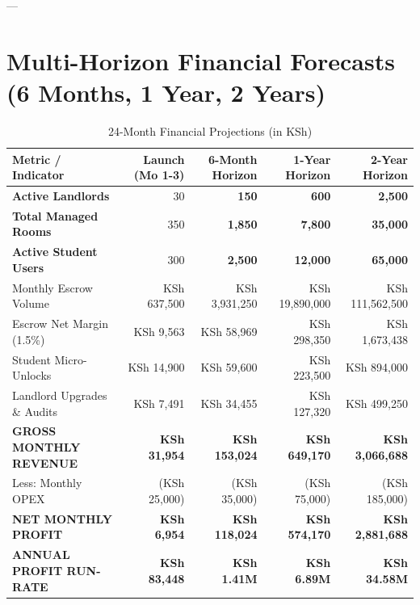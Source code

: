 \documentclass[11pt,a4paper]{article}
\begin{document}
---

\section{Multi-Horizon Financial Forecasts (6 Months, 1 Year, 2 Years)}

\begin{table}[h]
\centering
\begin{tabularx}{\textwidth}{X r r r r}
\toprule
\textbf{Metric / Indicator} & \textbf{Launch (Mo 1-3)} & \textbf{6-Month Horizon} & \textbf{1-Year Horizon} & \textbf{2-Year Horizon} \\
\midrule
\textbf{Active Landlords} & 30 & \textbf{150} & \textbf{600} & \textbf{2,500} \\
\textbf{Total Managed Rooms} & 350 & \textbf{1,850} & \textbf{7,800} & \textbf{35,000} \\
\textbf{Active Student Users} & 300 & \textbf{2,500} & \textbf{12,000} & \textbf{65,000} \\
\midrule
Monthly Escrow Volume & KSh 637,500 & KSh 3,931,250 & KSh 19,890,000 & KSh 111,562,500 \\
\midrule
Escrow Net Margin (1.5\%) & KSh 9,563 & KSh 58,969 & KSh 298,350 & KSh 1,673,438 \\
Student Micro-Unlocks & KSh 14,900 & KSh 59,600 & KSh 223,500 & KSh 894,000 \\
Landlord Upgrades \& Audits & KSh 7,491 & KSh 34,455 & KSh 127,320 & KSh 499,250 \\
\midrule
\textbf{GROSS MONTHLY REVENUE} & \textbf{KSh 31,954} & \textbf{KSh 153,024} & \textbf{KSh 649,170} & \textbf{KSh 3,066,688} \\
Less: Monthly OPEX & (KSh 25,000) & (KSh 35,000) & (KSh 75,000) & (KSh 185,000) \\
\midrule
\textbf{NET MONTHLY PROFIT} & \textbf{KSh 6,954} & \textbf{KSh 118,024} & \textbf{KSh 574,170} & \textbf{KSh 2,881,688} \\
\textbf{ANNUAL PROFIT RUN-RATE} & \textbf{KSh 83,448} & \textbf{KSh 1.41M} & \textbf{KSh 6.89M} & \textbf{KSh 34.58M} \\
\bottomrule
\end{tabularx}
\caption{24-Month Financial Projections (in KSh)}
\end{table}
\end{document}
